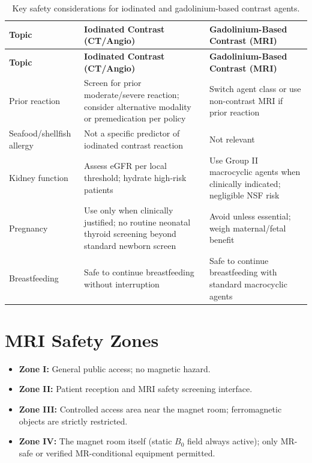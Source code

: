 \begin{longtable}{@{}p{}p{}p{}@{}}
\caption{Key safety considerations for iodinated and gadolinium-based contrast agents.}
\label{tab:app_contrast_safety} \\
\toprule
\textbf{Topic} & \textbf{Iodinated Contrast (CT/Angio)} & \textbf{Gadolinium-Based Contrast (MRI)} \\
\midrule
\endfirsthead
\toprule
\textbf{Topic} & \textbf{Iodinated Contrast (CT/Angio)} & \textbf{Gadolinium-Based Contrast (MRI)} \\
\midrule
\endhead
Prior reaction & Screen for prior moderate/severe reaction; consider alternative modality or premedication per policy & Switch agent class or use non-contrast MRI if prior reaction \\
Seafood/shellfish allergy & Not a specific predictor of iodinated contrast reaction & Not relevant \\
Kidney function & Assess eGFR per local threshold; hydrate high-risk patients & Use Group II macrocyclic agents when clinically indicated; negligible NSF risk \\
Pregnancy & Use only when clinically justified; no routine neonatal thyroid screening beyond standard newborn screen & Avoid unless essential; weigh maternal/fetal benefit \\
Breastfeeding & Safe to continue breastfeeding without interruption & Safe to continue breastfeeding with standard macrocyclic agents \\
\bottomrule
\end{longtable}

\section{MRI Safety Zones}
\begin{itemize}
    \item \textbf{Zone I:} General public access; no magnetic hazard.
    \item \textbf{Zone II:} Patient reception and MRI safety screening interface.
    \item \textbf{Zone III:} Controlled access area near the magnet room; ferromagnetic objects are strictly restricted.
    \item \textbf{Zone IV:} The magnet room itself (static $B_0$ field always active); only MR-safe or verified MR-conditional equipment permitted.
\end{itemize}
